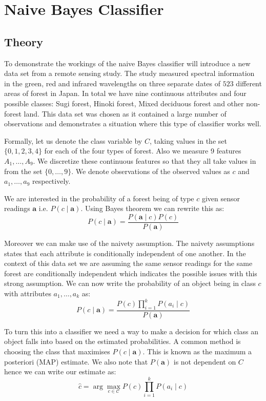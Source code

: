 \chapter{Naive Bayes Classifier}

\section{Theory}

To demonstrate the workings of the naive Bayes classifier will introduce a new data set from a remote sensing study.
The study measured spectral information in the green, red and infrared wavelengths on three separate dates of $523$ different areas of forest in Japan.
In total we have nine continuous attributes and four possible classes: Sugi forest, Hinoki forest, Mixed deciduous forest and other non-forest land. This data set was chosen as it contained a large number of observations and demonstrates a situation where this type of classifier works well.

Formally, let us denote the class variable by $C$, taking values in the set $\{0,1,2,3,4\}$ for each of the four types of forest.
Also we measure 9 features $A_1,\dots,A_9$.
We discretize these continuous features so that they all take values in from the set $\{0,\dots,9\}$.
We denote observations of the observed values as $c$ and $a_1,\dots,a_9$ respectively.

We are interested in the probability of a forest being of type $c$ given sensor readings $\mathbf{a}$ i.e. $P(c \mid \mathbf{a})$.
Using Bayes theorem we can rewrite this as:
\begin{equation}
	P(c \mid \mathbf{a}) = \frac{P(\mathbf{a} \mid c)P(c)}{P(\mathbf{a})}
\end{equation}

Moreover we can make use of the naivety assumption.
The naivety assumptions states that each attribute is conditionally independent of one another.
In the context of this data set we are assuming the same sensor readings for the same forest are conditionally independent which indicates the possible issues with this strong assumption.
We can now write the probability of an object being in class $c$ with attributes $a_1,\dots,a_k$ as:
\begin{equation}
	P(c \mid \mathbf{a}) = \frac{P(c)\prod_{i=1}^{k}P(a_i \mid c)}{P(\mathbf{a})}
\end{equation}

To turn this into a classifier we need a way to make a decision for which class an object falls into based on the estimated probabilities.
A common method is choosing the class that maximises $P(c \mid \mathbf{a})$.
This is known as the maximum a posteriori (MAP) estimate.
We also note that $P(\mathbf{a})$ is not dependent on $C$ hence we can write our estimate as:
\begin{equation}
	\hat c = \arg\max_{c \in \mathcal{C}} P(c)\prod_{i=1}^{k}P(a_i \mid c)
\end{equation}

